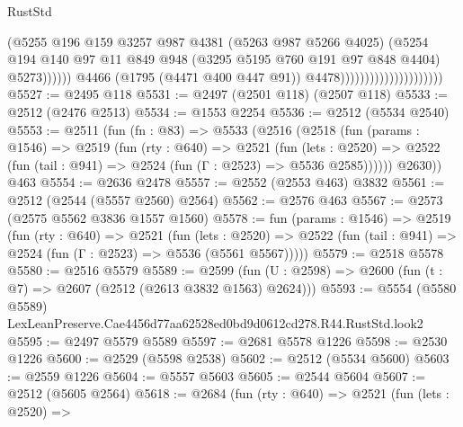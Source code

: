 \begin{lexlean}{RustStd}
\begin{coremodule}
                                                      (@5255
                                                        @196
                                                        @159
                                                        @3257
                                                        @987
                                                        @4381
                                                        (@5263 @987 @5266 @4025)
                                                        (@5254
                                                          @194
                                                          @140
                                                          @97
                                                          @11
                                                          @849
                                                          @948
                                                          (@3295 @5195 @760 @191 @97 @848 @4404)
                                                          @5273))))))
                                              @4466
                                              (@1795 (@4471 @400 @447 @91))
                                              @4478)))))))))))))))))))))
@5527 := @2495 @118
@5531 := @2497 (@2501 @118) (@2507 @118)
@5533 := @2512 (@2476 @2513)
@5534 := @1553 @2254
@5536 := @2512 (@5534 @2540)
@5553 := @2511
    (fun (fn : @83) =>
    @5533
      (@2516
        (@2518
          (fun (params : @1546) =>
          @2519
            (fun (rty : @640) =>
            @2521
              (fun (lets : @2520) =>
              @2522 (fun (tail : @941) => @2524 (fun (Γ : @2523) => @5536 @2585))))))
        @2630))
    @463
@5554 := @2636 @2478
@5557 := @2552 (@2553 @463) @3832
@5561 := @2512 (@2544 (@5557 @2560) @2564)
@5562 := @2576 @463
@5567 := @2573 (@2575 @5562 @3836 @1557 @1560)
@5578 := fun (params : @1546) =>
  @2519
    (fun (rty : @640) =>
    @2521
      (fun (lets : @2520) =>
      @2522 (fun (tail : @941) => @2524 (fun (Γ : @2523) => @5536 (@5561 @5567)))))
@5579 := @2518 @5578
@5580 := @2516 @5579
@5589 := @2599 (fun (U : @2598) => @2600 (fun (t : @7) => @2607 (@2512 (@2613 @3832 @1563) @2624)))
@5593 := @5554 (@5580 @5589) LexLeanPreserve.Cae4456d77aa62528ed0bd9d0612cd278.R44.RustStd.look2
@5595 := @2497 @5579 @5589
@5597 := @2681 @5578 @1226
@5598 := @2530 @1226
@5600 := @2529 (@5598 @2538)
@5602 := @2512 (@5534 @5600)
@5603 := @2559 @1226
@5604 := @5557 @5603
@5605 := @2544 @5604
@5607 := @2512 (@5605 @2564)
@5618 := @2684
    (fun (rty : @640) =>
    @2521
      (fun (lets : @2520) =>

\end{coremodule}
\end{lexlean}
